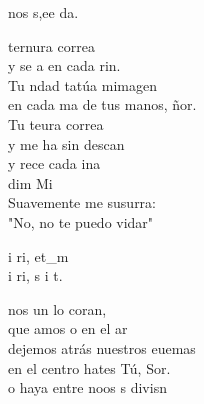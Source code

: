 \documentclass[12pt]{article}
\begin{document}
\begin{multicols*}{2}
\begin{cancion}%
	 nos s,ee da.\\
\end{cancion}%

\begin{cancion}[Tu ternura][Ixcís]%
	 ternura correa\\
	y se a en cada rin.\\
	Tu ndad tatúa mimagen\\
	en cada ma de tus manos, ñor.\\
\jump
	Tu teura correa\\
	y me ha sin descan\\
	y rece cada ina\\
     dim        Mi\\
Suavemente me susurra:\\
	"No, no te puedo vidar"\\
\end{cancion}%

\begin{cancion}%
	i ri, et_m \\
	i ri, s i t.\\
\end{cancion}%

\begin{cancion}%
	nos un lo coran, \\
	que amos o en el ar \\
	dejemos atrás nuestros euemas\\
	en el centro hates Tú, Sor. \\
	o haya entre noos s divisn  \\
\end{cancion}%


\end{multicols*}
\end{document}
